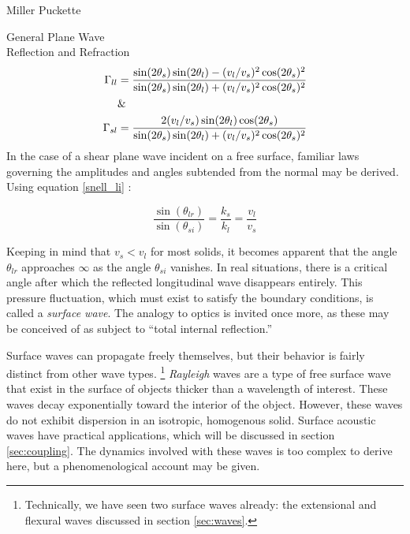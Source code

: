 \documentclass[a4paper,10pt]{report}
\numberwithin{equation}{section}
\begin{document}
\begin{chapter}{Miller Puckette}
\begin{section}{General Plane Wave \\ Reflection and Refraction}
\begin{align}\label{gamma_llsl}
\Gamma_{ll} &= \frac{\sin(2\theta_s)\sin(2\theta_l) - (v_l / v_s)^2\cos(2\theta_s)^2}{\sin(2\theta_s)\sin(2\theta_l) + (v_l / v_s)^2\cos(2\theta_s)^2}\\
&\text{\&}\notag\\
\Gamma_{sl} &= \frac{2(v_l/v_s) \sin(2\theta_l)\cos(2\theta_s)}{\sin(2\theta_s)\sin(2\theta_l) + (v_l / v_s)^2\cos(2\theta_s)^2}
\end{align}
In the case of a shear plane wave incident on a free surface, familiar laws governing the amplitudes and angles subtended from the normal may be derived. Using equation \eqref{snell_li} :

\begin{equation}\label{snell_si}
\frac{\sin(\theta_{lr})}{\sin(\theta_{si})} = \frac{k_s}{k_l} = \frac{v_l}{v_s}
\end{equation}

Keeping in mind that $v_s < v_l$ for most solids, it becomes apparent that the angle $\theta_{lr}$ approaches $\infty$ as the angle $\theta_{si}$ vanishes. In real situations, there is a critical angle after which the reflected longitudinal wave disappears entirely. This pressure fluctuation, which must exist to satisfy the boundary conditions, is called a \emph{surface wave}. The analogy to optics is invited once more, as these may be conceived of as subject to ``total internal reflection.''\cite[p.~145]{Cremer1973} 

Surface waves can propagate freely themselves, but their behavior is fairly distinct from other wave types. \footnote{Technically, we have seen two surface waves already: the extensional and flexural waves discussed in section \ref{sec:waves}.} \cite[p.~150]{Cremer1973} \emph{Rayleigh} waves are a type of free surface wave that exist in the surface of objects thicker than a wavelength of interest. These waves decay exponentially toward the interior of the object. However, these waves do not exhibit dispersion in an isotropic, homogenous solid.\cite[p.~152]{Cremer1973}\cite[p.~113]{Kino1987} Surface acoustic waves have practical applications, which will be discussed in section \ref{sec:coupling}. The dynamics involved with these waves is too complex to derive here, but a phenomenological account may be given. 


\end{section}
\end{chapter}
\end{document}
